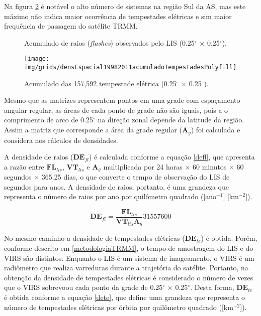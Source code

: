 Na figura \ref{taxaTotalTe} é notável o alto número de sistemas na região Sul da AS, mas este máximo não indica maior ocorrência de tempestades elétricas e sim maior frequência de passagem do satélite TRMM. 


\begin{figure}[!ht]
  \centering
\caption{Acumulado de raios (\textit{flashes}) observados pelo LIS (0.25$^{\circ}$  $\times$ 0.25$^{\circ}$).}
\label{taxatotalraios}
\end{figure}   
  
\begin{figure}[!ht]
  \centering 
  {{\texttt{[image: img/grids/densEspacial19982011acumuladoTempestadesPolyfill]}}}
\caption{Acumulado das 157,592 tempestade elétrica (0.25$^{\circ}$  $\times$ 0.25$^{\circ}$).}
\label{taxaTotalTe}
\end{figure} 

Mesmo que as matrizes representem pontos em uma grade com espaçamento angular regular, as áreas de cada ponto de grade não são iguais, pois a  o comprimento de arco de 0.25$^{\circ}$ na direção zonal depende da latitude da região. Assim a matriz que corresponde a área da grade regular ($\mathbf{A}_g$) foi calculada e considera nos cálculos de densidades.


A densidade de raios ($\mathbf{DE}_{fl}$) é calculada conforme a equação \ref{defl}, que apresenta a razão entre $\mathbf{FL}_{lis}$, $\mathbf{VT}_{lis}$ e $\mathbf{A}_g$ multiplicada por 24 horas $\times$ 60 minutos $\times$ 60 segundos $\times$ 365.25 dias, o que converte o tempo de observação do LIS de segundos para anos. A densidade de raios, portanto, é uma grandeza que representa o número de raios por ano por quilômetro quadrado ([ano$^{-1}$] [km$^{-2}$]).

\begin{equation}
\mathbf{DE}_{fl} = \frac{\mathbf{FL}_{lis}}{\mathbf{VT}_{lis} \mathbf{A}_g} 31557600     
\label{defl}
\end{equation}

No mesmo caminho a densidade de tempestades elétricas ($\mathbf{DE}_{te}$) é obtida. Porém, conforme descrito em \ref{metodologiaTRMM}, o tempo de amostragem do LIS e do VIRS são distintos. Enquanto o LIS é um sistema de imageamento, o VIRS é um radiômetro que realiza varreduras durante a trajetória do satélite. Portanto, na obtenção da densidade de tempestades elétricas é considerado o número de vezes que o VIRS sobrevoou cada ponto da grade de 0.25$^{\circ}$  $\times$ 0.25$^{\circ}$. Desta forma, $\mathbf{DE}_{te}$ é obtida conforme a equação \ref{dete}, que define uma grandeza que representa o número de tempestades elétricas por órbita por quilômetro quadrado ([km$^{-2}$]).


